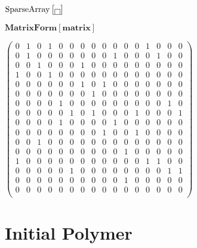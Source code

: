 \documentclass{article}
\begin{document}
\begin{doublespace}
\noindent\(\text{SparseArray}\left[\fbox{$$}\right]\)
\end{doublespace}

\begin{doublespace}
\noindent\(\pmb{\text{MatrixForm}[\text{matrix}]}\)
\end{doublespace}

\begin{doublespace}
\noindent\(\left(
\begin{array}{cccccccccccccccc}
 0 & 1 & 0 & 1 & 0 & 0 & 0 & 0 & 0 & 0 & 0 & 0 & 1 & 0 & 0 & 0 \\
 0 & 1 & 0 & 0 & 0 & 0 & 0 & 0 & 0 & 1 & 0 & 0 & 0 & 1 & 0 & 0 \\
 0 & 0 & 1 & 0 & 0 & 0 & 1 & 0 & 0 & 0 & 0 & 0 & 0 & 0 & 0 & 0 \\
 1 & 0 & 0 & 1 & 0 & 0 & 0 & 0 & 0 & 0 & 0 & 0 & 0 & 0 & 0 & 0 \\
 0 & 0 & 0 & 0 & 0 & 0 & 1 & 0 & 1 & 0 & 0 & 0 & 0 & 0 & 0 & 0 \\
 0 & 0 & 0 & 0 & 0 & 0 & 0 & 1 & 0 & 0 & 0 & 0 & 0 & 0 & 0 & 0 \\
 0 & 0 & 0 & 0 & 1 & 0 & 0 & 0 & 0 & 0 & 0 & 0 & 0 & 0 & 1 & 0 \\
 0 & 0 & 0 & 0 & 0 & 1 & 0 & 1 & 0 & 0 & 0 & 1 & 0 & 0 & 0 & 1 \\
 0 & 0 & 0 & 0 & 1 & 0 & 0 & 0 & 0 & 1 & 0 & 0 & 0 & 0 & 0 & 0 \\
 0 & 0 & 0 & 0 & 0 & 0 & 0 & 0 & 1 & 0 & 0 & 1 & 0 & 0 & 0 & 0 \\
 0 & 0 & 1 & 0 & 0 & 0 & 0 & 0 & 0 & 0 & 0 & 0 & 0 & 0 & 0 & 0 \\
 0 & 0 & 0 & 0 & 0 & 0 & 0 & 0 & 0 & 0 & 1 & 0 & 0 & 0 & 0 & 0 \\
 1 & 0 & 0 & 0 & 0 & 0 & 0 & 0 & 0 & 0 & 0 & 0 & 1 & 1 & 0 & 0 \\
 0 & 0 & 0 & 0 & 0 & 1 & 0 & 0 & 0 & 0 & 0 & 0 & 0 & 0 & 1 & 1 \\
 0 & 0 & 0 & 0 & 0 & 0 & 0 & 0 & 0 & 0 & 1 & 0 & 0 & 0 & 0 & 0 \\
 0 & 0 & 0 & 0 & 0 & 0 & 0 & 0 & 0 & 0 & 0 & 0 & 0 & 0 & 0 & 0 \\
\end{array}
\right)\)
\end{doublespace}

\section*{Initial Polymer}
\end{document}

